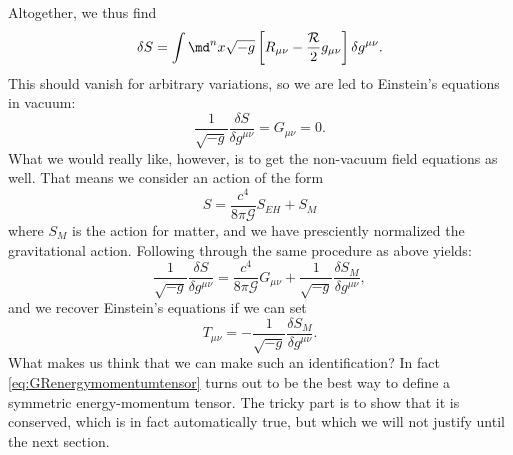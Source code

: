 Altogether, we thus find
\begin{equation}
	\delta S = \int \md^n x \sqrt{-g}  \left[R_{\mu \nu} - \frac{\mathcal{R}}{2} g_{\mu \nu} \right]\delta g^{\mu \nu}.
\end{equation}
This should vanish for arbitrary variations, so we are led to Einstein’s equations in vacuum:
\begin{equation}
	\frac{1}{\sqrt{-g}} \frac{\delta S}{\delta g^{\mu \nu}} = G_{\mu \nu} =0.
\end{equation}
What we would really like, however, is to get the non-vacuum field equations
as well. That means we consider an action of the form
\begin{equation}
	S = \frac{c^4}{8 \pi \mathcal{G}} S_{EH} + S_M
\end{equation}
where $S_M$ is the action for matter, and we have presciently normalized the gravitational
action. Following through the same procedure as above yields:
\begin{equation}
		\frac{1}{\sqrt{-g}} \frac{\delta S}{\delta g^{\mu \nu}} = \frac{c^4}{8 \pi \mathcal{G}} G_{\mu \nu} + \frac{1}{\sqrt{-g}} \frac{\delta S_M}{\delta g^{\mu \nu}},
\end{equation}
and we recover Einstein’s equations if we can set
\begin{equation}
\label{eq:GRenergymomentumtensor}
	T_{\mu \nu} = - \frac{1}{\sqrt{-g}} \frac{\delta S_M}{\delta g^{\mu \nu}}.
\end{equation}
What makes us think that we can make such an identification? In fact \ref{eq:GRenergymomentumtensor} turns out to
be the best way to define a symmetric energy-momentum tensor. The tricky part is to show
that it is conserved, which is in fact automatically true, but which we will not justify until
the next section.
